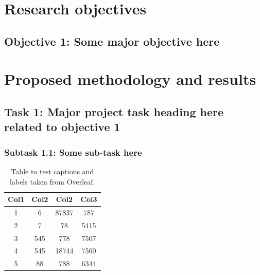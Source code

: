\section{Research objectives}                   %

\blindtext \cite{knuthwebsite}

\subsection*{Objective 1: Some major objective here}

\blindtext







\section{Proposed methodology and results}      %

\blindtext

\subsection{Task 1: Major project task heading here related to objective 1}

\blindtext


\subsubsection*{Subtask 1.1: Some sub-task here}

\blindtext

\begin{table}[ht]
\centering
\begin{tabular}{c c c c} 
\toprule \toprule
Col1 & Col2 & Col2 & Col3 \\ 
\toprule \toprule
1 & 6 & 87837 & 787 \\ 
2 & 7 & 78 & 5415 \\
3 & 545 & 778 & 7507 \\
4 & 545 & 18744 & 7560 \\
5 & 88 & 788 & 6344 \\ 
\bottomrule
\end{tabular}
\caption{Table to test captions and labels taken from Overleaf.}
\label{table:1}
\end{table}



